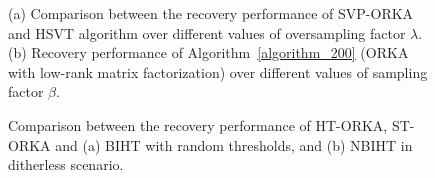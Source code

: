 \documentclass[12pt,draftcls,onecolumn]{IEEEtran}
\begin{document}
\begin{figure}[t]
	\centering
	\caption{(a) Comparison between the recovery performance of SVP-ORKA and HSVT algorithm over different values of oversampling factor $\lambda$. (b) Recovery performance of Algorithm~\ref{algorithm_200} (ORKA with low-rank matrix factorization) over different values of sampling factor $\beta$.
  \vspace{-15pt}
 }
	\label{figure_3}
\end{figure}
\begin{figure}[t]
	\centering
	\caption{Comparison between the recovery performance of HT-ORKA, ST-ORKA and (a) BIHT with random thresholds, and (b) NBIHT in ditherless scenario.
  \vspace{-15pt}
 }
	\label{figure_4}
\end{figure}
\end{document}
